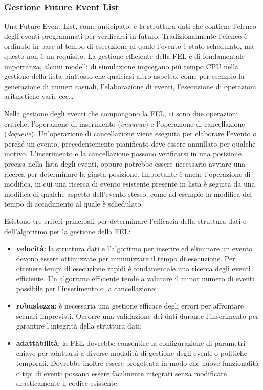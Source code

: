 \documentclass[12pt,a4paper,openright,twoside]{book}
\begin{document}
\subsubsection{Gestione Future Event List}
Una Future Event List, come anticipato, è la struttura dati che contiene l'elenco degli eventi programmati per verificarsi in futuro. Tradizionalmente l'elenco è ordinato in base al tempo di esecuzione al quale l'evento è stato schedulato, ma questo non è un requisito. 
La gestione efficiente della FEL è di fondamentale importanza, alcuni modelli di simulazione impiegano più tempo CPU nella gestione della lista piuttosto che qualsiasi altro aspetto, come per esempio la generazione di numeri casuali, l'elaborazione di eventi, l'esecuzione di operazioni aritmetiche varie ecc\dots

Nella gestione degli eventi che compongono la FEL, ci sono due operazioni critiche: l'operazione di inserimento (\textit{enqueue}) e l'operazione di cancellazione (\textit{dequeue}). Un'operazione di cancellazione viene eseguita per elaborare l'evento o perché un evento, precedentemente pianificato deve essere annullato per qualche motivo. L'inserimento e la cancellazione possono verificarsi in una posizione precisa nella lista degli eventi, oppure potrebbe essere necessario avviare una ricerca per determinare la giusta posizione. 
Importante è anche l'operazione di modifica, in cui una ricerca di evento esistente presente in lista è seguita da una modifica di qualche aspetto dell'evento stesso, come ad esempio la modifica del tempo di accadimento al quale è schedulato. 

Esistono tre criteri principali per determinare l'efficacia della struttura dati e dell'algoritmo per la gestione della FEL: 
\begin{itemize}
    \item \textbf{velocità}: la struttura dati e l'algoritmo per inserire ed eliminare un evento devono essere ottimizzate per minimizzare il tempo di esecuzione. Per ottenere tempi di esecuzione rapidi è fondamentale una ricerca degli eventi efficiente. Un algoritmo efficiente tende a valutare il minor numero di eventi possibile per l'inserimento o la cancellazione;
    \item  \textbf{robustezza}: è necessaria una gestione efficace degli errori per affrontare scenari imprevisti. Occorre una validazione dei dati durante l'inserimento per garantire l'integrità della struttura dati; 
    \item \textbf{adattabilità}: la FEL dovrebbe consentire la configurazione di parametri chiave per adattarsi a diverse modalità di gestione degli eventi o politiche temporali. Dovrebbe inoltre essere progettata in modo che nuove funzionalità o tipi di eventi possano essere facilmente integrati senza modificare drasticamente il codice esistente. 
\end{itemize}
\end{document}
